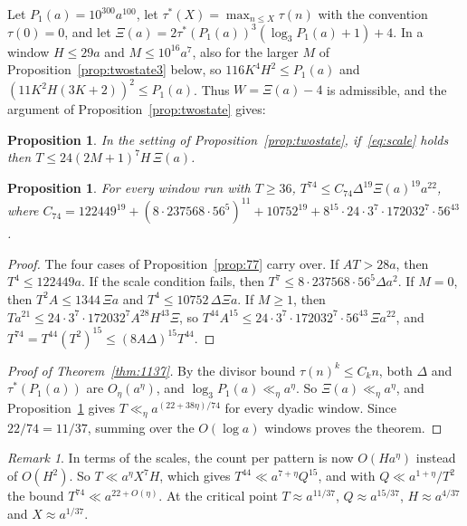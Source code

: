 \documentclass[11pt]{amsart}
\newtheorem{proposition}[theorem]{Proposition}
\theoremstyle{definition}
\theoremstyle{remark}
\newtheorem{remark}[theorem]{Remark}
\begin{document}
Let $P_1(a)=10^{300}a^{100}$, let $\tau^*(X)=\max_{n\le X}\tau(n)$ with the convention
$\tau(0)=0$, and let $\Xi(a)=2\tau^*(P_1(a))^3(\log_3P_1(a)+1)+4$. In a window $H\le29a$ and $M\le10^{16}a^7$, also for
the larger $M$ of Proposition~\ref{prop:twostate3} below, so
$116K^4H^2\le P_1(a)$ and $(11K^2H(3K+2))^2\le P_1(a)$. Thus $W=\Xi(a)-4$ is admissible, and the
argument of Proposition~\ref{prop:twostate} gives:

\begin{proposition}\label{prop:twostate2}
In the setting of Proposition~\ref{prop:twostate}, if~\eqref{eq:scale} holds then
$T\le 24(2M+1)^7H\,\Xi(a)$.
\end{proposition}

\begin{proposition}\label{prop:74}
For every window run with $T\ge36$, $T^{74}\le C_{74}\Delta^{19}\Xi(a)^{19}a^{22}$, where
$C_{74}=122449^{19}+(8\cdot237568\cdot56^5)^{11}+10752^{19}+8^{15}\cdot24\cdot3^7\cdot172032^7\cdot56^{43}$.
\end{proposition}

\begin{proof}
The four cases of Proposition~\ref{prop:77} carry over. If $AT>28a$, then $T^4\le122449a$. If
the scale condition fails, then $T^7\le8\cdot237568\cdot56^5\Delta a^2$. If $M=0$, then
$T^2A\le1344\,\Xi a$ and $T^4\le10752\,\Delta\Xi a$. If $M\ge1$, then
$Ta^{21}\le24\cdot3^7\cdot172032^7A^{28}H^{43}\Xi$, so $T^{44}A^{15}\le
24\cdot3^7\cdot172032^7\cdot56^{43}\,\Xi a^{22}$, and $T^{74}=T^{44}(T^2)^{15}\le(8A\Delta)^{15}T^{44}$.
\end{proof}

\begin{proof}[Proof of Theorem~\ref{thm:1137}]
By the divisor bound $\tau(n)^k\le C_kn$, both $\Delta$ and $\tau^*(P_1(a))$ are
$O_\eta(a^\eta)$, and $\log_3P_1(a)\ll_\eta a^\eta$. So $\Xi(a)\ll_\eta a^\eta$, and
Proposition~\ref{prop:74} gives $T\ll_\eta a^{(22+38\eta)/74}$ for every dyadic window. Since
$22/74=11/37$, summing over the $O(\log a)$ windows proves the theorem.
\end{proof}

\begin{remark}
In terms of the scales, the count per pattern is now $O(Ha^\eta)$ instead of $O(H^2)$. So
$T\ll a^\eta X^7H$, which gives $T^{44}\ll a^{7+\eta}Q^{15}$, and with $Q\ll a^{1+\eta}/T^2$ the
bound $T^{74}\ll a^{22+O(\eta)}$. At the critical point $T\approx a^{11/37}$, $Q\approx
a^{15/37}$, $H\approx a^{4/37}$ and $X\approx a^{1/37}$.
\end{remark}
\end{document}
